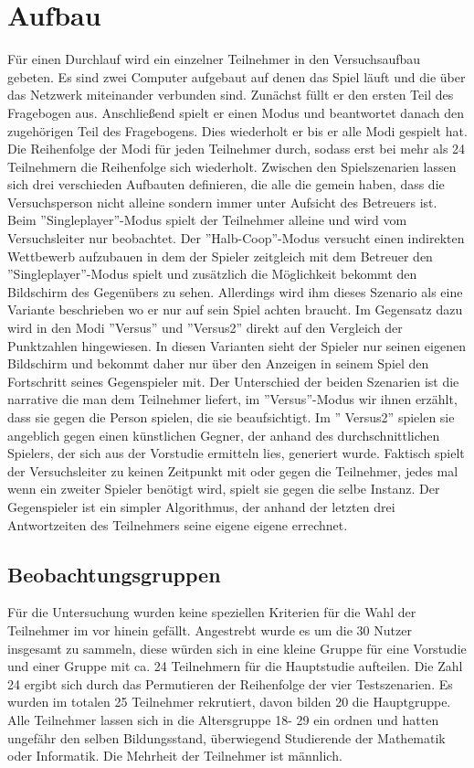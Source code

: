 \section{Aufbau}
Für einen Durchlauf wird ein einzelner Teilnehmer in den Versuchsaufbau gebeten. Es sind zwei Computer aufgebaut auf denen das Spiel läuft und die über das Netzwerk miteinander verbunden sind. Zunächst füllt er den ersten Teil des Fragebogen aus. Anschließend spielt er einen Modus und beantwortet danach den zugehörigen Teil des Fragebogens. Dies wiederholt er bis er alle Modi gespielt hat. Die Reihenfolge der Modi für jeden Teilnehmer durch, sodass erst bei mehr als 24 Teilnehmern die Reihenfolge sich wiederholt. Zwischen den Spielszenarien lassen sich drei verschieden Aufbauten definieren, die alle die gemein haben, dass die Versuchsperson nicht alleine sondern immer unter Aufsicht des Betreuers ist. Beim ''Singleplayer''-Modus spielt der  Teilnehmer alleine und wird vom Versuchsleiter nur beobachtet. Der ''Halb-Coop''-Modus  versucht einen indirekten Wettbewerb aufzubauen in dem der Spieler zeitgleich mit dem Betreuer den ''Singleplayer''-Modus spielt und zusätzlich die Möglichkeit bekommt den Bildschirm des Gegenübers zu sehen. Allerdings wird ihm dieses Szenario als eine Variante beschrieben wo er nur auf sein Spiel achten braucht. Im Gegensatz dazu wird in den Modi ''Versus'' und ''Versus2'' direkt auf den Vergleich der Punktzahlen hingewiesen. In diesen Varianten sieht der Spieler nur seinen eigenen Bildschirm und bekommt daher nur über den Anzeigen in seinem Spiel den Fortschritt seines Gegenspieler mit. Der Unterschied der beiden Szenarien ist die narrative die man dem Teilnehmer liefert, im ''Versus''-Modus wir ihnen erzählt, dass sie gegen die Person spielen, die sie beaufsichtigt. Im '' Versus2'' spielen sie angeblich gegen einen künstlichen  Gegner, der anhand des durchschnittlichen Spielers, der sich aus der Vorstudie ermitteln lies, generiert wurde. Faktisch spielt der Versuchsleiter zu keinen Zeitpunkt mit oder gegen die Teilnehmer, jedes mal wenn ein zweiter Spieler benötigt wird, spielt sie gegen die selbe Instanz. Der Gegenspieler ist ein simpler Algorithmus, der anhand der letzten drei Antwortzeiten des Teilnehmers seine eigene eigene errechnet.
\subsection{Beobachtungsgruppen}
Für die Untersuchung wurden keine speziellen Kriterien für die Wahl der Teilnehmer im vor hinein gefällt. Angestrebt wurde es um die 30 Nutzer insgesamt zu sammeln, diese würden sich in eine kleine Gruppe für eine Vorstudie und einer Gruppe mit ca. 24 Teilnehmern für die Hauptstudie aufteilen. Die Zahl 24 ergibt sich durch das Permutieren der Reihenfolge der vier Testszenarien. Es wurden im totalen 25 Teilnehmer rekrutiert, davon bilden 20 die Hauptgruppe. Alle Teilnehmer lassen sich in die Altersgruppe 18- 29 ein ordnen und hatten ungefähr den selben Bildungsstand, überwiegend Studierende der Mathematik oder Informatik. Die Mehrheit der Teilnehmer ist männlich.

